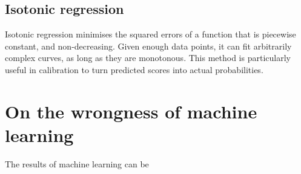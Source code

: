 \subsection{Isotonic regression}
Isotonic regression minimises the squared errors of a function that is piecewise constant, and non-decreasing.
Given enough data points, it can fit arbitrarily complex curves, as long as they are monotonous.
This method is particularly useful in calibration to turn predicted scores into actual probabilities.

\begin{center}
\end{center}


\section{On the wrongness of machine learning}\label{sec:wrong}
The results of machine learning can be 
